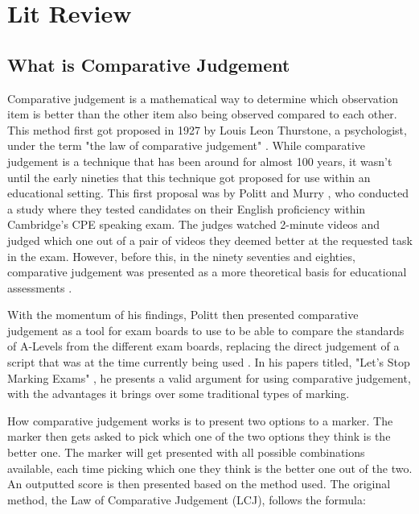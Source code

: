 \chapter{Lit Review}
	\label{chap:lit_review}
	
	
	\section{What is Comparative Judgement}
		Comparative judgement is a mathematical way to determine which observation item is better than the other item also being observed compared to each other. This method first got proposed in 1927 by Louis Leon Thurstone, a psychologist, under the term "the law of comparative judgement" \cite{thurstone1927psychophysical, thurstone1927law}. While comparative judgement is a technique that has been around for almost 100 years, it wasn't until the early nineties that this technique got proposed for use within an educational setting. This first proposal was by Politt and Murry \cite{pollitt1996raters}, who conducted a study where they tested candidates on their English proficiency within Cambridge's CPE speaking exam. The judges watched 2-minute videos and judged which one out of a pair of videos they deemed better at the requested task in the exam. However, before this, in the ninety seventies and eighties, comparative judgement was presented as a more theoretical basis for educational assessments \cite{andrich1978rating}. 
		
		With the momentum of his findings, Politt then presented comparative judgement as a tool for exam boards to use to be able to compare the standards of A-Levels from the different exam boards, replacing the direct judgement of a script that was at the time currently being used \cite{newton2007paired}. In his papers titled, "Let's Stop Marking Exams" \cite{stop_marking_pollitt}, he presents a valid argument for using comparative judgement, with the advantages it brings over some traditional types of marking.
		
		How comparative judgement works is to present two options to a marker. The marker then gets asked to pick which one of the two options they think is the better one. The marker will get presented with all possible combinations available, each time picking which one they think is the better one out of the two. An outputted score is then presented based on the method used. The original method, the Law of Comparative Judgement (LCJ), follows the formula:
		
